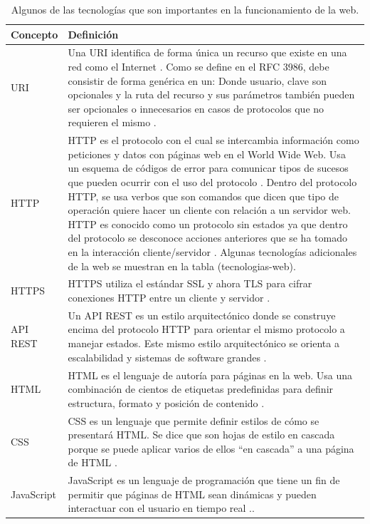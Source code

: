 \begin{table}[h!]
    \begin{tabular}{|p{}|p{}|}
    	\hline
        Concepto & Definición \\
    	\hline
        URI & Una URI identifica de forma única un recurso que existe en una red como el Internet \citep{Webopedia-URI}. Como se define en el RFC 3986, debe consistir de forma genérica en un:
        \newline
[protocolo de acceso][usuario][clave][dominio][ruta de recurso][parámetros de acceso al recurso]
		\newline
Donde usuario, clave son opcionales y la ruta del recurso y sus parámetros también pueden ser opcionales o innecesarios en casos de protocolos que no requieren el mismo \citep{RFC3986}. \\
        \hline
    	HTTP & HTTP es el protocolo con el cual se intercambia información como peticiones y datos con páginas web en el World Wide Web. Usa un esquema de códigos de error para comunicar tipos de sucesos que pueden ocurrir con el uso del protocolo \citep{ComputerHope-HTTP}. Dentro del protocolo HTTP, se usa verbos que son comandos que dicen que tipo de operación quiere hacer un cliente con relación a un servidor web. HTTP es conocido como un protocolo sin estados ya que dentro del protocolo se desconoce acciones anteriores que se ha tomado en la interacción cliente/servidor \citep{Webopedia-HTTP}. Algunas tecnologías adicionales de la web se muestran en la tabla (tecnologias-web). \\
        \hline
        HTTPS & HTTPS utiliza el estándar SSL y ahora TLS para cifrar conexiones HTTP entre un cliente y servidor \citep{ComputerHope-HTTP}. \\
        \hline
        API REST & Un API REST es un estilo arquitectónico donde se construye encima del protocolo HTTP para orientar el mismo protocolo a manejar estados. Este mismo estilo arquitectónico se orienta a escalabilidad y sistemas de software grandes \citep{Webopedia-REST}. \\
        \hline
        HTML & HTML es el lenguaje de autoría para páginas en la web. Usa una combinación de cientos de etiquetas predefinidas para definir estructura, formato y posición de contenido \citep{Webopedia-HTML}. \\
        \hline
        CSS & CSS es un lenguaje que permite definir estilos de cómo se presentará HTML. Se dice que son hojas de estilo en cascada porque se puede aplicar varios de ellos “en cascada” a una página de HTML \citep{Webopedia-CSS}. \\
        \hline
        JavaScript & JavaScript es un lenguaje de programación que tiene un fin de permitir que páginas de HTML sean dinámicas y pueden interactuar con el usuario en tiempo real \citep{Webopedia-JavaScript}.. \\
        \hline
    \end{tabular}
	\caption{Algunos de las tecnologías que son importantes en la funcionamiento de la web.}
    \label{tecnologias-web}
\end{table}

